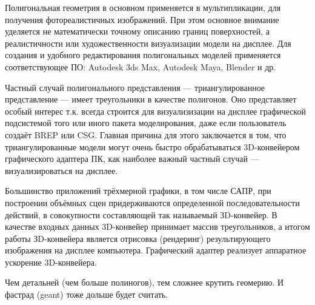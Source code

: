 Полигональная геометрия в основном применяется в мультипликации, для получения фотореалистичных изображений. При этом основное внимание уделяется не математически точному описанию границ поверхностей, а реалистичности или художественности визуализации модели на дисплее.
Для создания и удобного редактирования полигональных моделей применяется соответствующее ПО: Autodesk 3ds Max, Autodesk Maya, Blender и др.

Частный случай полигонального представления --- триангулированное представление --- имеет треугольники в качестве полигонов. Оно представляет особый интерес т.к. всегда строится для визуализизации на дисплее графической подсистемой того или иного пакета моделирования, даже если пользователь создаёт BREP или CSG. Главная причина для этого заключается в том, что триангулированные модели могут очень быстро обрабатываться 3D-конвейером графического адаптера ПК, как наиболее важный частный случай --- визуализироваться на дисплее.


Большинство приложений трёхмерной графики, в том числе САПР, при построении объёмных сцен придерживаются определенной последо­вательности действий, в совокупности составляющей так называемый ЗD-конвейер. В качестве входных данных 3D-конвейер принимает массив треугольников, а итогом работы ЗD-конвейера является отрисовка (рендеринг) резуль­тирующего изображения на дисплее компьютера. Графический адаптер реализует аппаратное ускорение 3D-конвейера.

\todo Чем детальней (чем больше полиногов), тем сложнее крутить геомерию. И фастрад (geant) тоже дольше будет считать.



